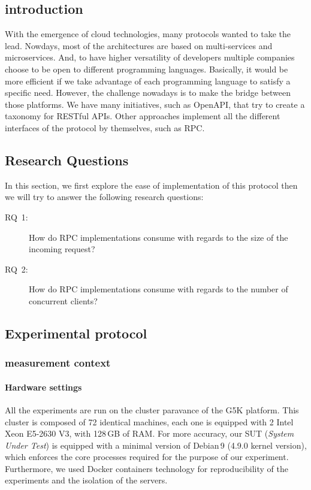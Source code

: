 

\subsection*{introduction}
With the emergence of cloud technologies, many protocols wanted to take the lead.
Nowdays, most of the architectures are based on multi-services and microservices.
And, to have higher versatility of developers multiple companies choose to be open to different programming languages.
Basically, it would be more efficient if we take advantage of each programming language to satisfy a specific need.
However, the challenge nowadays is to make the bridge between those platforms.
We have many initiatives, such as OpenAPI, that try to create a taxonomy for RESTful APIs.
Other approaches implement all the different interfaces of the protocol by themselves, such as RPC.

\subsection{Research Questions}
In this section, we first explore the ease of implementation of this protocol then we will try to answer the following research questions:
\begin{description}
    \item[\textsc{RQ}~1:] How do RPC implementations consume with regards to the size of the incoming request?
    \item[\textsc{RQ}~2:] How do RPC implementations consume with regards to the number of concurrent clients?
\end{description}

\subsection{Experimental protocol}
\subsubsection{measurement context}
\paragraph{Hardware settings}
All the experiments are run on the cluster \textsf{paravance} of the G5K platform.
This cluster is composed of 72 identical machines, each one is equipped with 2 Intel Xeon E5-2630 V3, with 128\,GB of RAM.
For more accuracy, our SUT (\emph{System Under Test}) is equipped with a minimal version of Debian\,9 (4.9.0 kernel version), which enforces the core processes required for the purpose of our experiment.
Furthermore, we used Docker containers technology for reproducibility of the experiments and the isolation of the servers.
